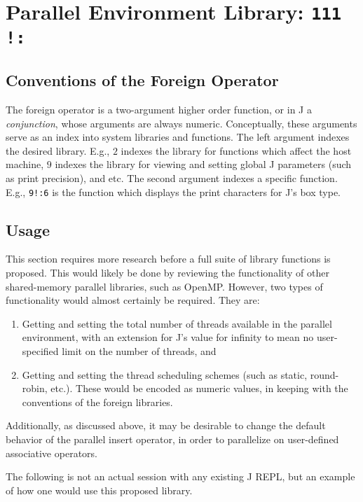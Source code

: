 \section{Parallel Environment Library: \texttt{111 !:}} 
\label{pfor}

\subsection{Conventions of the Foreign Operator}
The foreign operator is a two-argument higher order function, or in J a \textit{conjunction}, 
whose arguments are always numeric.
Conceptually, these arguments serve as an index into system libraries and functions.
The left argument indexes the desired library.
E.g., $2$ indexes the library for functions which affect the host machine, 
$9$ indexes the library for viewing and setting global J parameters (such as print precision), and etc.
The second argument indexes a specific function.
E.g., \texttt{9!:6}  is the function which displays the print characters for J's box type.

\subsection{Usage}
This section requires more research before a full suite of library functions is proposed.
This would likely be done by reviewing the functionality of other shared-memory parallel libraries, such as OpenMP\cite{openmp}. 
However, two types of functionality would almost certainly be required.
They are:

\begin{enumerate}
    \item Getting and setting the total number of threads available in the parallel environment,
        with an extension for J's value for infinity to mean no user-specified limit on the number of threads, and
    \item Getting and setting the thread scheduling schemes (such as static, round-robin, etc.).
        These would be encoded as numeric values, in keeping with the conventions of the foreign libraries.
\end{enumerate}

Additionally, as discussed above, it may be desirable to change 
the default behavior of the parallel insert operator, 
in order to parallelize on user-defined associative operators.

The following is not an actual session with any existing J REPL, 
but an example of how one would use this proposed library.

